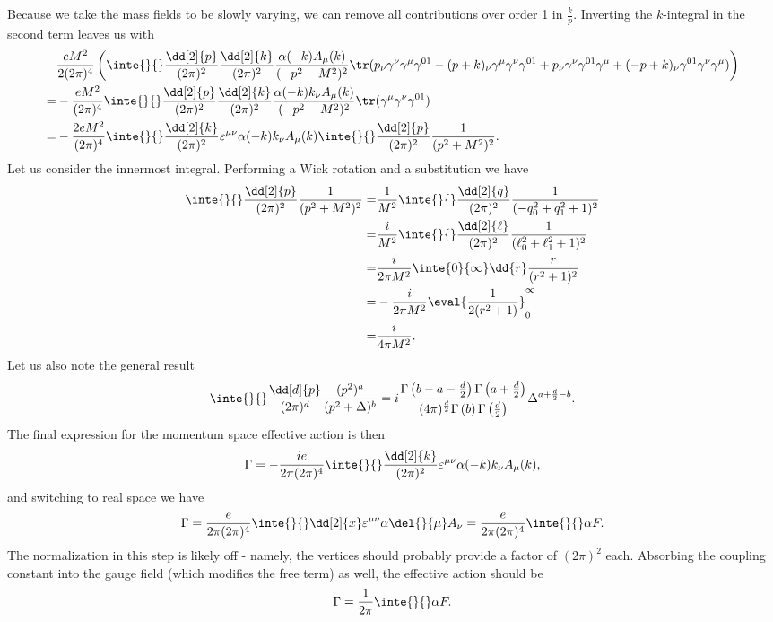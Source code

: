 Because we take the mass fields to be slowly varying, we can remove all contributions over order 1 in $\frac{k}{p}$. Inverting the $k$-integral in the second term leaves us with
\begin{align*}
	 &\frac{eM^{2}}{2(2\pi)^{4}}\left(\inte{}{}\frac{\dd[2]{p}}{(2\pi)^{2}}\frac{\dd[2]{k}}{(2\pi)^{2}}\frac{\alpha(-k)A_{\mu}(k)}{(-p^{2} - M^{2})^{2}}\tr(p_{\nu}\gamma^{\nu}\gamma^{\mu}\gamma^{01} - (p + k)_{\nu}\gamma^{\mu}\gamma^{\nu}\gamma^{01} + p_{\nu}\gamma^{\nu}\gamma^{01}\gamma^{\mu} + (-p + k)_{\nu}\gamma^{01}\gamma^{\nu}\gamma^{\mu})\right) \\
	=& -\frac{eM^{2}}{(2\pi)^{4}}\inte{}{}\frac{\dd[2]{p}}{(2\pi)^{2}}\frac{\dd[2]{k}}{(2\pi)^{2}}\frac{\alpha(-k)k_{\nu}A_{\mu}(k)}{(-p^{2} - M^{2})^{2}}\tr(\gamma^{\mu}\gamma^{\nu}\gamma^{01}) \\
	=& -\frac{2eM^{2}}{(2\pi)^{4}}\inte{}{}\frac{\dd[2]{k}}{(2\pi)^{2}}\varepsilon^{\mu\nu}\alpha(-k)k_{\nu}A_{\mu}(k)\inte{}{}\frac{\dd[2]{p}}{(2\pi)^{2}}\frac{1}{(p^{2} + M^{2})^{2}}.
\end{align*}
Let us consider the innermost integral. Performing a Wick rotation and a substitution we have
\begin{align*}
	\inte{}{}\frac{\dd[2]{p}}{(2\pi)^{2}}\frac{1}{(p^{2} + M^{2})^{2}} =& \frac{1}{M^{2}}\inte{}{}\frac{\dd[2]{q}}{(2\pi)^{2}}\frac{1}{(-q_{0}^{2} + q_{1}^{2} + 1)^{2}} \\
	=& \frac{i}{M^{2}}\inte{}{}\frac{\dd[2]{\ell}}{(2\pi)^{2}}\frac{1}{(\ell_{0}^{2} + \ell_{1}^{2} + 1)^{2}} \\
	=& \frac{i}{2\pi M^{2}}\inte{0}{\infty}\dd{r}\frac{r}{(r^{2} + 1)^{2}} \\
	=& -\frac{i}{2\pi M^{2}}\eval{\frac{1}{2(r^{2} + 1)}}_{0}^{\infty} \\
	=& \frac{i}{4\pi M^{2}}.
\end{align*}
Let us also note the general result
\begin{align*}
	\inte{}{}\frac{\dd[d]{p}}{(2\pi)^{d}}\frac{(p^{2})^{a}}{(p^{2} + \Delta)^{b}} = i\frac{\Gamma\left(b - a - \frac{d}{2}\right)\Gamma\left(a + \frac{d}{2}\right)}{(4\pi)^{\frac{d}{2}}\Gamma\left(b\right)\Gamma\left(\frac{d}{2}\right)}\Delta^{a + \frac{d}{2} - b}.
\end{align*}
The final expression for the momentum space effective action is then
\begin{align*}
	\Gamma = -\frac{ie}{2\pi(2\pi)^{4}}\inte{}{}\frac{\dd[2]{k}}{(2\pi)^{2}}\varepsilon^{\mu\nu}\alpha(-k)k_{\nu}A_{\mu}(k),
\end{align*}
and switching to real space we have
\begin{align*}
	\Gamma = \frac{e}{2\pi(2\pi)^{4}}\inte{}{}\dd[2]{x}\varepsilon^{\mu\nu}\alpha\del{}{\mu}A_{\nu} = \frac{e}{2\pi(2\pi)^{4}}\inte{}{}\alpha F.
\end{align*}
The normalization in this step is likely off - namely, the vertices should probably provide a factor of $(2\pi)^{2}$ each. Absorbing the coupling constant into the gauge field (which modifies the free term) as well, the effective action should be
\begin{align*}
	\Gamma = \frac{1}{2\pi}\inte{}{}\alpha F.
\end{align*}

